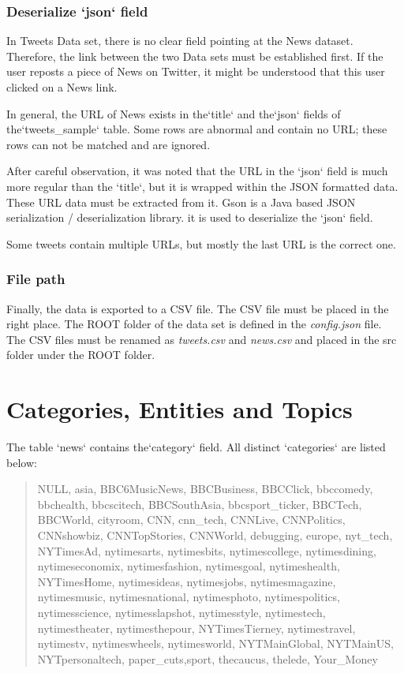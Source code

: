 \subsubsection{Deserialize `json` field}
In Tweets Data set, there is no clear field pointing at the News dataset. Therefore, the link between the two Data sets must be established first. If the user reposts a piece of News on Twitter, it might be understood that this user clicked on a News link.

In general, the URL of News exists in the`title` and the`json` fields of the`tweets\_sample` table. Some rows are abnormal and contain no URL; these rows can not be matched and are ignored.

After careful observation, it was noted that the URL in the `json` field is much more regular than the `title`, but it is wrapped within the JSON formatted data. These URL data must be extracted from it.
Gson is a Java based JSON serialization / deserialization library. it is used to deserialize the `json` field.

Some tweets contain multiple URLs, but mostly the last URL is the correct one.

\subsubsection{File path}
Finally, the data is exported to a CSV file. The CSV file must be placed in the right place. The ROOT folder of the data set is defined in the  \textit{config.json} file. The CSV files must be renamed as \textit{tweets.csv} and \textit{news.csv} and placed in the src folder under the ROOT folder.

\section{Categories, Entities and Topics}
The table `news` contains the`category` field. All distinct `categories` are listed below:

\begin{quote}
NULL, asia, BBC6MusicNews, BBCBusiness, BBCClick, bbccomedy, bbchealth, bbcscitech, BBCSouthAsia, bbcsport\_ticker, BBCTech, BBCWorld, cityroom, CNN, cnn\_tech, CNNLive, CNNPolitics, CNNshowbiz, CNNTopStories, CNNWorld, debugging, europe, nyt\_tech, NYTimesAd, nytimesarts, nytimesbits, nytimescollege, nytimesdining, nytimeseconomix, nytimesfashion, nytimesgoal, nytimeshealth, NYTimesHome, nytimesideas, nytimesjobs, nytimesmagazine, nytimesmusic, nytimesnational, nytimesphoto, nytimespolitics, nytimesscience, nytimesslapshot, nytimesstyle, nytimestech, nytimestheater, nytimesthepour, NYTimesTierney, nytimestravel, nytimestv, nytimeswheels, nytimesworld, NYTMainGlobal, NYTMainUS, NYTpersonaltech, paper\_cuts,sport, thecaucus, thelede, Your\_Money
\end{quote}

